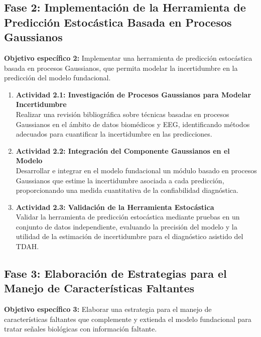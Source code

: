\subsection*{Fase 2: Implementación de la Herramienta de Predicción Estocástica Basada en Procesos Gaussianos}
\textbf{Objetivo específico 2:} Implementar una herramienta de predicción estocástica basada en procesos Gaussianos, que permita modelar la incertidumbre en la predicción del modelo fundacional.

\begin{enumerate}
	\item \textbf{Actividad 2.1: Investigación de Procesos Gaussianos para Modelar Incertidumbre}\\
	Realizar una revisión bibliográfica sobre técnicas basadas en procesos Gaussianos en el ámbito de datos biomédicos y EEG, identificando métodos adecuados para cuantificar la incertidumbre en las predicciones.
	
	\item \textbf{Actividad 2.2: Integración del Componente Gaussianos en el Modelo}\\
	Desarrollar e integrar en el modelo fundacional un módulo basado en procesos Gaussianos que estime la incertidumbre asociada a cada predicción, proporcionando una medida cuantitativa de la confiabilidad diagnóstica.
	
	\item \textbf{Actividad 2.3: Validación de la Herramienta Estocástica}\\
	Validar la herramienta de predicción estocástica mediante pruebas en un conjunto de datos independiente, evaluando la precisión del modelo y la utilidad de la estimación de incertidumbre para el diagnóstico asistido del TDAH.
\end{enumerate}

\subsection*{Fase 3: Elaboración de Estrategias para el Manejo de Características Faltantes}
\textbf{Objetivo específico 3:} Elaborar una estrategia para el manejo de características faltantes que complemente y extienda el modelo fundacional para tratar señales biológicas con información faltante.

